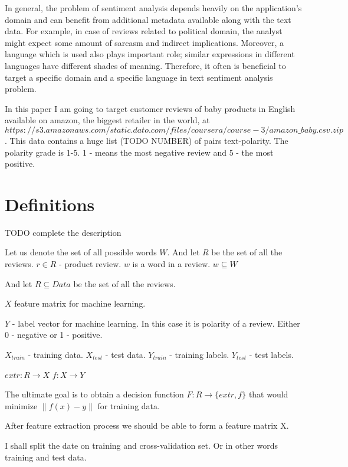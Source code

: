 \documentclass[12pt]{report}
\begin{document}
In general, the problem of sentiment analysis depends heavily on the application's domain and can benefit from additional metadata available along with the text data. For example, in case of reviews related to political domain, the analyst might expect some amount of sarcasm and indirect implications. Moreover, a language which is used also plays important role; similar expressions in different languages have different shades of meaning. Therefore, it often is beneficial to target a specific domain and a specific language in text sentiment analysis problem.

In this paper I am going to target customer reviews of baby products in English available on amazon, the biggest retailer in the world, at $https://s3.amazonaws.com/static.dato.com/files/coursera/course-3/amazon\_baby.csv.zip$.
This data contains a huge list (TODO NUMBER) of pairs text-polarity. The polarity grade is 1-5. 1 - means the most negative review and 5 - the most positive.

\section{Definitions}

TODO complete the description

Let us denote the set of all possible words $W$.
And let $R$ be the set of all the reviews.
$r \in R$ - product review.
$w$ is a word in a review.
$w \subseteq W$


And let $R \subseteq Data$ be the set of all the reviews.

$X$ feature matrix for machine learning.

$Y$ - label vector for machine learning. In this case it is polarity of a review. Either 0 - negative or 1 - positive.

$X_{train}$ - training data.
$X_{test}$ - test data.
$Y_{train}$ - training labels.
$Y_{test}$ - test labels.

$extr: R \rightarrow X$
$f: X \rightarrow Y$

The ultimate goal is to obtain a decision function $F : R \rightarrow \{extr, f\}$ that would minimize $\|f(x) - y\|$ for training data.

After feature extraction process we should be able to form a feature matrix X.

I shall split the date on training and cross-validation set. Or in other words training and test data.

\newpage
\end{document}
